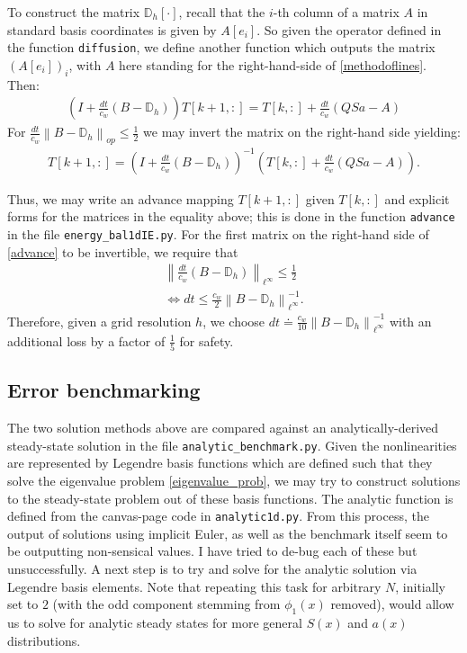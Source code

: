 \documentclass{article}
\theoremstyle{remark}
\newcommand{\norm}[1]{\left\lVert#1\right\rVert}
\begin{document}
To construct the matrix $\mathbb{D}_h[\cdot]$, recall that the $i$-th column of
a matrix $A$ in standard basis coordinates is given by $A[e_i]$. So given the operator
defined in the function \verb+diffusion+, we define another function which outputs
the matrix $(A[e_i])_i$, with $A$ here standing for the right-hand-side of
\eqref{methodoflines}. Then:
\begin{align}
	\left( I + \frac{dt}{c_w} \left( B - \mathbb{D}_h \right) \right) T[k+1,:] 
	= T[k,:] + \frac{dt}{c_w} \left( QSa - A \right)
\end{align}
For $\frac{dt}{c_w}\norm{ B - \mathbb{D}_h }_{op} \leq \frac{1}{2}$ we may invert
the matrix on the right-hand side yielding:
\begin{align}\label{advance}
	T[k+1,:] = \left( I + \frac{dt}{c_w} \left( B - \mathbb{D}_h \right) \right)^{-1}
				\left( T[k,:] + \frac{dt}{c_w} \left( QSa - A \right) \right).
\end{align}

Thus, we may write an advance mapping $T[k+1,:]$ given $T[k,:]$ and explicit forms 
for the matrices in the equality above; this is done in the function \verb+advance+
in the file \verb+energy_bal1dIE.py+. For the first matrix on the right-hand side of
\eqref{advance} to be invertible, we require that
\begin{align}
	\norm{ \frac{dt}{c_w} \left( B - \mathbb{D}_h \right) }_{\ell^\infty} \leq \frac{1}{2}	\\
	\Leftrightarrow dt \leq \frac{c_w}{2} \norm{B - \mathbb{D}_h }_{\ell^\infty}^{-1}.
\end{align}
Therefore, given a grid resolution $h$, we choose 
$dt \doteq \frac{c_w}{10} \norm{B - \mathbb{D}_h }_{\ell^\infty}^{-1}$ with an additional
loss by a factor of $\frac{1}{5}$ for safety.


\subsection{Error benchmarking}

The two solution methods above are compared against an analytically-derived steady-state
solution in the file \verb+analytic_benchmark.py+. Given the nonlinearities are represented
by Legendre basis functions which are defined such that they solve the eigenvalue problem
\eqref{eigenvalue_prob}, we may try to construct solutions to the steady-state problem
out of these basis functions. The analytic function is defined from the canvas-page code
in \verb+analytic1d.py+. From this process, the output of solutions using implicit Euler,
as well as the benchmark itself seem to be outputting non-sensical values. I have tried to
de-bug each of these but unsuccessfully. A next step is to try and 
solve for the analytic solution via Legendre basis elements. Note that repeating this task 
for arbitrary $N$, initially set to $2$ (with the odd component stemming from $\phi_1(x)$ removed),
would allow us to solve for analytic steady states for more general $S(x)$ and $a(x)$ distributions. 
\end{document}
